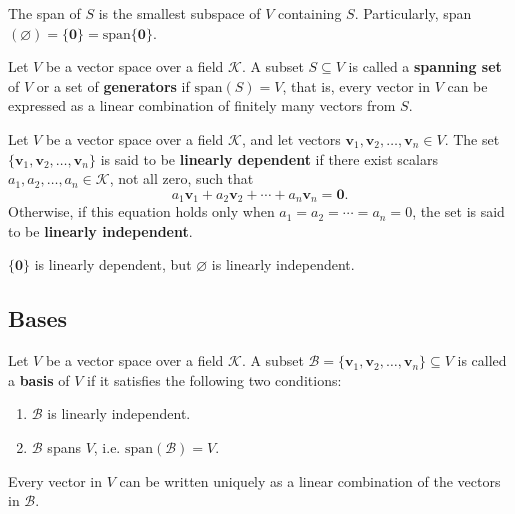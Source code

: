 \documentclass{ctexart}
\begin{document}
	\begin{mythm}
		The span of $S$ is the smallest subspace of $V$ containing $S$. Particularly, span$(\varnothing)=\{\mathbf{0}\}=\text{span}\{\mathbf{0}\}$.
	\end{mythm}
	\begin{mydef}
		Let $V$ be a vector space over a field $\mathcal{K}$.  
		A subset $S \subseteq V$ is called a \textbf{spanning set} of $V$ or a set of \textbf{generators}
		if $\mathrm{span}(S) = V$, that is, every vector in $V$ can be expressed 
		as a linear combination of finitely many vectors from $S$.
	\end{mydef}
	\begin{mydef}
		Let $V$ be a vector space over a field $\mathcal{K}$, and let vectors
		$\mathbf{v}_1, \mathbf{v}_2, \dots, \mathbf{v}_n \in V$.  
		The set $\{\mathbf{v}_1, \mathbf{v}_2, \dots, \mathbf{v}_n\}$ is said to be 
		\textbf{linearly dependent} if there exist scalars 
		$a_1, a_2, \dots, a_n \in \mathcal{K}$, not all zero, such that
		\[
		a_1 \mathbf{v}_1 + a_2 \mathbf{v}_2 + \cdots + a_n \mathbf{v}_n = \mathbf{0}.
		\]
		Otherwise, if this equation holds only when 
		$a_1 = a_2 = \cdots = a_n = 0$, the set is said to be 
		\textbf{linearly independent}.
	\end{mydef}
	\begin{myrmk}
		$\{\mathbf{0}\}$ is linearly dependent, but $\varnothing$ is linearly independent.
	\end{myrmk}
	
	
	\subsection{Bases}
	\begin{mydef}
		Let $V$ be a vector space over a field $\mathcal{K}$.  
		A subset $\mathcal{B} = \{\mathbf{v}_1, \mathbf{v}_2, \dots, \mathbf{v}_n\} \subseteq V$ is called a \textbf{basis} of $V$ if it satisfies the following two conditions:
		\begin{enumerate}
			\item $\mathcal{B}$ is linearly independent.
			\item $\mathcal{B}$ spans $V$, i.e. $\mathrm{span}(\mathcal{B}) = V$.
		\end{enumerate}
		
	\end{mydef}
	\begin{mythm}
		 Every vector in $V$ can be written uniquely as a linear combination of the vectors in $\mathcal{B}$.
	\end{mythm}
	
\end{document}
